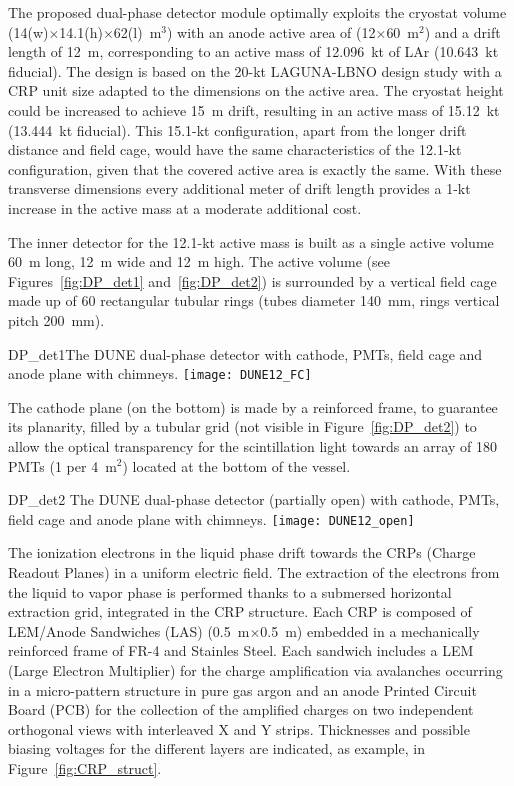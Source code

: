 The proposed dual-phase detector module optimally exploits the cryostat volume  (14(w)$\times$14.1(h)$\times$62(l)~m$^3$) with an anode active area  of (12$\times$60~m$^2$) and a drift length of 12~m, corresponding to an active mass of 12.096~kt of LAr (10.643~kt fiducial). The design is based on the 20-kt LAGUNA-LBNO design study with a CRP unit size adapted to the dimensions on the active area. The cryostat height could be increased to achieve 15~m drift, resulting in an active mass of 15.12~kt (13.444~kt fiducial).  This 15.1-kt  configuration, apart from the longer drift distance and field cage, would have the same characteristics of the 12.1-kt  configuration, given that the covered active area is exactly the same. With these transverse dimensions every additional meter of drift length provides a 1-kt increase in the active mass  at a moderate additional cost.

The inner detector for the 12.1-kt active mass is built as a single active volume 60~m long, 12~m wide and 12~m high. The active volume (see
Figures~\ref{fig:DP_det1} and~\ref{fig:DP_det2}) is surrounded by a vertical field cage made up of 60 rectangular tubular rings (tubes diameter 140~mm, rings vertical pitch 200~mm). 

\begin{cdrfigure}{DP_det1}{The DUNE dual-phase 
detector with cathode, PMTs, field cage and anode plane with chimneys.}
\texttt{[image: DUNE12\_FC]}
\end{cdrfigure}

The cathode plane (on the bottom) is made by a reinforced frame, to guarantee its planarity, filled by a tubular grid (not visible in Figure~\ref{fig:DP_det2}) to allow the optical transparency for the scintillation light towards an array of 180 PMTs (1 per 4~m$^2$) located at the bottom of the vessel.

\begin{cdrfigure}{DP_det2}
{The DUNE dual-phase detector (partially open) with cathode, PMTs, field cage and anode plane with chimneys.}
\texttt{[image: DUNE12\_open]}
\end{cdrfigure}

The ionization electrons in the liquid phase drift towards the CRPs (Charge Readout Planes) in a uniform electric field. The extraction of the electrons from the liquid to vapor phase is performed thanks to a submersed horizontal extraction grid, integrated in the CRP structure.
Each CRP is composed of LEM/Anode Sandwiches (LAS) (0.5~m$\times$0.5~m) embedded in a mechanically reinforced frame of FR-4 and Stainles Steel.  Each sandwich includes a LEM (Large Electron Multiplier) for the charge amplification via avalanches occurring in a micro-pattern structure in pure gas argon and an anode Printed Circuit Board (PCB) for the collection of the amplified charges on two independent orthogonal views with interleaved X and Y strips.  Thicknesses and possible biasing voltages for the different layers are indicated, as example, in Figure~\ref{fig:CRP_struct}.

